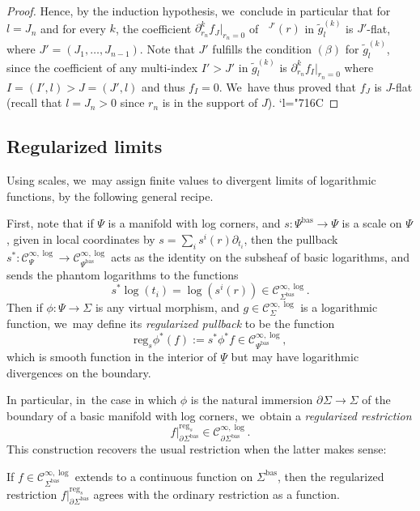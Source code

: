 \documentclass[10pt]{amsart}
\newcommand{\Changelback}{\mathcode`l="716C}
\theoremstyle{definition}
\theoremstyle{remark}
\let\defn\emph
\newcommand{\ulog}{\mathop{\widetilde{\log}}\nolimits}
\newcommand{\ug}{\widetilde{g}}
\newcommand{\Cinflog}[1]{\mathscr{C}^{\infty,\log}_{#1}}
\newcommand{\cvf}[1]{\partial_{#1}}
\newcommand{\reg}[1][]{\mathrm{reg}_{#1}}
\newcommand{\Sig}{\Sigma}
\newcommand{\uPsi}{\underline{\Psi}}
\newcommand{\bas}[1]{{#1}^{\mathrm{bas}}}
\newcommand{\Sigbas}{\bas{\Sig}}
\newcommand{\bdSig}[1][]{\partial^{#1}\Sigma}
\newcommand{\bdSigbas}[1][]{\partial^{#1}\Sigbas}
\newcommand{\Psibas}{\bas{\Psi}}
\begin{document}
\begin{proof}
Hence, by the induction hypothesis, we~conclude in particular that for $l=J_n$ and for every $k$, the coefficient $\cvf{r_n}^k f_J|_{r_n=0}$ of $\ulog{}\!^{J'}(r)$ in $\ug_l^{(k)}$ is $J'$-flat, where $J'=(J_1,\ldots,J_{n-1})$. Note that $J'$ fulfills the condition $(\beta)$ for $\ug_l^{(k)}$, since the coefficient of any multi-index $I'>J'$ in $\ug_l^{(k)}$ is $\cvf{r_n}^k f_I|_{r_n=0}$ where $I=(I',l)>J=(J',l)$ and thus $f_I=0$. We~have thus proved that $f_J$ is $J$-flat (recall that $l=J_n>0$ since $r_n$ is in the support of $J$).
\Changelback
\end{proof}

\subsection{Regularized limits} Using scales, we~may assign finite values to divergent limits of logarithmic functions, by the following general recipe.

First, note that if $\Psi$ is a manifold with log corners, and $s : \Psibas \to \Psi$ is a scale on $\Psi$, given in local coordinates by $s = \sum_i s^i(r)\cvf{t_i}$, then the pullback $s^* : \Cinflog{\Psi} \to \Cinflog{\Psibas}$ acts as the identity on the subsheaf of basic logarithms, and sends the phantom logarithms to the functions\vspace*{-3pt}
\[
s^*\log(t_i) = \log(s^i(r)) \in \Cinflog{\Sigbas}.
\]
Then if $\phi : \Psi \to \Sig$ is any virtual morphism, and $g \in \Cinflog{\Sig}$ is a logarithmic function, we~may define its \defn{regularized pullback} to be the function\vspace*{-3pt}
\[
\reg[s] \phi^*(f) := s^*\phi^*f \in \Cinflog{\Psibas},
\]
which is smooth function in the interior of $\uPsi$ but may have logarithmic divergences on the boundary.

In particular, in~the case in which $\phi$ is the natural immersion $\bdSig \to \Sig$ of the boundary of a basic manifold with log corners, we~obtain a \defn{regularized restriction}\vspace*{-3pt}
\[
f|_{\bdSigbas}^{\reg[s]} \in \Cinflog{\bdSigbas}.
\]
This construction recovers the usual restriction when the latter makes sense:

\begin{lemma}\label{lem:continuous-restriction}
If $f \in \Cinflog{\Sigbas}$ extends to a continuous function on $\Sigbas$, then the regularized restriction $f|_{\bdSigbas}^{\reg[s]}$ agrees with the ordinary restriction as a function.
\end{lemma}
\end{document}
